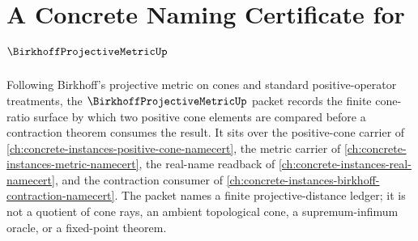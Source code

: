 \chapter{A Concrete Naming Certificate for $\BirkhoffProjectiveMetricUp$}
\label{ch:concrete-instances-birkhoff-projective-metric-namecert}

Following Birkhoff's projective metric on cones and standard positive-operator treatments, the $\BirkhoffProjectiveMetricUp$ packet records the finite cone-ratio surface by which two positive cone elements are compared before a contraction theorem consumes the result. It sits over the positive-cone carrier of \autoref{ch:concrete-instances-positive-cone-namecert}, the metric carrier of \autoref{ch:concrete-instances-metric-namecert}, the real-name readback of \autoref{ch:concrete-instances-real-namecert}, and the contraction consumer of \autoref{ch:concrete-instances-birkhoff-contraction-namecert}. The packet names a finite projective-distance ledger; it is not a quotient of cone rays, an ambient topological cone, a supremum-infimum oracle, or a fixed-point theorem.

